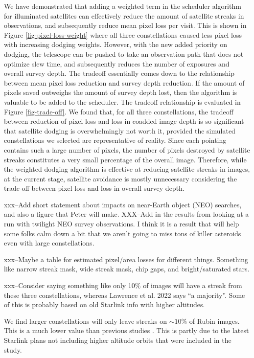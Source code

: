 \documentclass[linenumbers]{aastex631}
\begin{document}
We have demonstrated that adding a weighted term in the scheduler algorithm for illuminated satellites can effectively reduce the amount of satellite streaks in observations, and subsequently reduce mean pixel loss per visit. This is shown in Figure \ref{fig-pixel-loss-weight} where all three constellations caused less pixel loss with increasing dodging weights. However, with the new added priority on dodging, the telescope can be pushed to take an observation path that does not optimize slew time, and subsequently reduces the number of exposures and overall survey depth. The tradeoff essentially comes down to the relationship between mean pixel loss reduction and survey depth reduction. If the amount of pixels saved outweighs the amount of survey depth lost, then the algorithm is valuable to be added to the scheduler. The tradeoff relationship is evaluated in Figure \ref{fig-trade-off}. We found that, for all three constellations, the tradeoff between reduction of pixel loss and loss in coadded image depth is so significant that satellite dodging is overwhelmingly not worth it, provided the simulated constellations we selected are representative of reality. Since each pointing contains such a large number of pixels, the number of pixels destroyed by satellite streaks constitutes a very small percentage of the overall image. Therefore, while the weighted dodging algorithm is effective at reducing satellite streaks in images, at the current stage, satellite avoidance is mostly unnecessary considering the trade-off between pixel loss and loss in overall survey depth.

xxx--Add short statement about impacts on near-Earth object (NEO) searches, and also a figure that Peter will make.
XXX--Add in the results from looking at a run with twilight NEO survey observations. I think it is a result that will help some folks calm down a bit that we aren't going to miss tons of killer asteroids even with large constellations.

xxx--Maybe a table for estimated pixel/area losses for different things. Something like narrow streak mask, wide streak mask, chip gaps, and bright/saturated stars. 

xxx--Consider saying something like only 10\% of images will have a streak from these three constellations, whereas Lawrence et al. 2022 says ``a majority''. Some of this is probably based on old Starlink info with higher altitudes.

We find larger constellations will only leave streaks on $\sim10$\% of Rubin images. This is a much lower value than previous studies \citep{lawrence22, tyson20}. This is partly due to the latest Starlink plans not including higher altitude orbits that were included in the \citet{tyson} study. %
\end{document}
